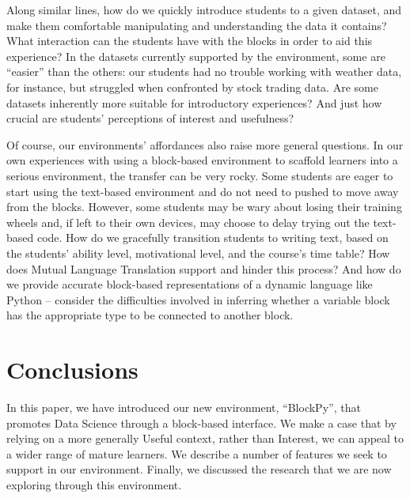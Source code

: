 \documentclass[conference]{IEEEtran}
\begin{document}
Along similar lines, how do we quickly introduce students to a given dataset, and make them comfortable manipulating and understanding the data it contains?
What interaction can the students have with the blocks in order to aid this experience?
In the datasets currently supported by the environment, some are ``easier'' than the others: our students had no trouble working with weather data, for instance, but struggled when confronted by stock trading data.
Are some datasets inherently more suitable for introductory experiences?
And just how crucial are students' perceptions of interest and usefulness? 

Of course, our environments' affordances also raise more general questions.
In our own experiences with using a block-based environment to scaffold learners into a serious environment, the transfer can be very rocky.
Some students are eager to start using the text-based environment and do not need to pushed to move away from the blocks.
However, some students may be wary about losing their training wheels and, if left to their own devices, may choose to delay trying out the text-based code.
How do we gracefully transition students to writing text, based on the students' ability level, motivational level, and the course's time table?
How does Mutual Language Translation support and hinder this process?
And how do we provide accurate block-based representations of a dynamic language like Python -- consider the difficulties involved in inferring whether a variable block has the appropriate type to be connected to another block.

\section{Conclusions}

In this paper, we have introduced our new environment, ``BlockPy'', that promotes Data Science through a block-based interface.
We make a case that by relying on a more generally Useful context, rather than Interest, we can appeal to a wider range of mature learners.
We describe a number of features we seek to support in our environment.
Finally, we discussed the research that we are now exploring through this environment.




%






\end{document}
